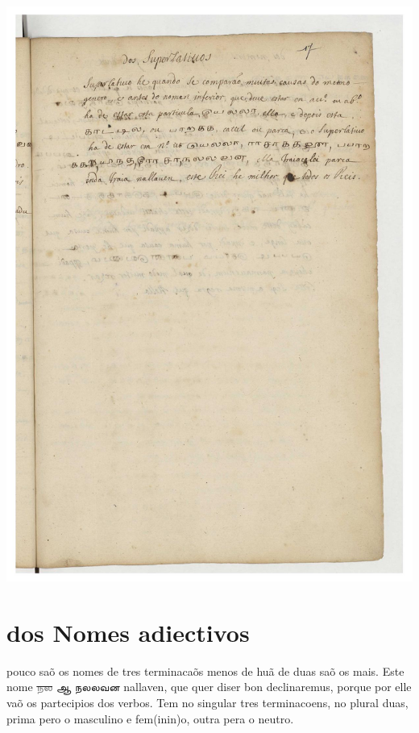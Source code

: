 \documentclass[12pt,a4paper]{scrbook}
\begin{document}
      
\newpage
\hypertarget{img-43}{
    \includegraphics[width=\textwidth]{img-43}}
\newpage
      \chapter*{dos Nomes adiectivos}
    
      

 pouco saõ os nomes de tres terminacaõs menos de huã de duas saõ os 
mais. Este 
 nome \sout{\textcolor{gray}{நல}} ஆ நலலவன nallaven, que quer diser bon declinaremus, porque por elle vaõ os 
partecipios dos verbos. Tem no singular tres terminacoens, no plural duas, prima 
pero o masculino e fem(inin)o, outra pera o neutro.
        
\end{document}
